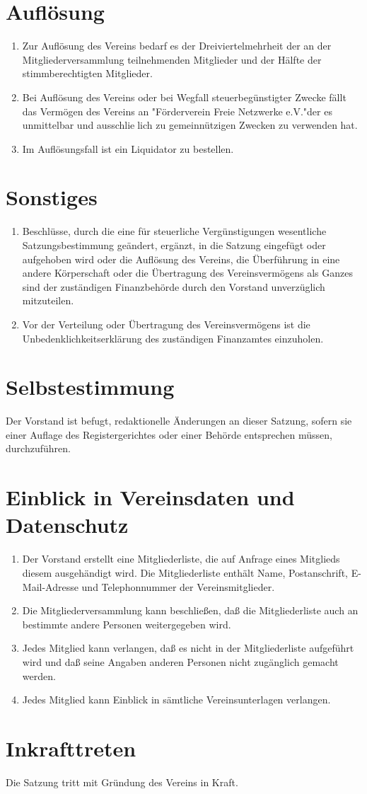 \documentclass[ngerman]{article}
\begin{document}
\section{Auflösung}
\begin{enumerate}
\item Zur Auflösung des Vereins bedarf es der Dreiviertelmehrheit der an der Mitgliederversammlung teilnehmenden Mitglieder und der Hälfte
der stimmberechtigten Mitglieder.
\item Bei Auflösung des Vereins oder bei Wegfall steuerbegünstigter Zwecke fällt das Vermögen
des  Vereins an  "Förderverein Freie Netzwerke e.V."der es unmittelbar und  ausschlielich zu gemeinnützigen Zwecken zu verwenden hat.
\item Im Auflösungsfall ist ein Liquidator zu bestellen.
\end{enumerate}

\section{Sonstiges}
\begin{enumerate}
\item Beschlüsse, durch die eine für steuerliche Vergünstigungen wesentliche Satzungsbestimmung geändert, ergänzt, in die Satzung eingefügt oder aufgehoben wird oder die Auflösung des Vereins, die Überführung in eine andere Körperschaft oder die Übertragung des Vereinsvermögens als Ganzes sind der zuständigen Finanzbehörde durch den Vorstand unverzüglich mitzuteilen.
\item Vor der Verteilung oder Übertragung des Vereinsvermögens ist die Unbedenklichkeitserklärung des zuständigen Finanzamtes einzuholen.
\end{enumerate}

\section{Selbstestimmung}
Der Vorstand ist befugt, redaktionelle Änderungen an dieser Satzung, sofern sie einer Auflage des Registergerichtes oder einer Behörde entsprechen müssen, durchzuführen.

\section{Einblick in Vereinsdaten und Datenschutz}
\begin{enumerate}
  \item Der Vorstand erstellt eine Mitgliederliste, die auf Anfrage eines Mitglieds diesem ausgehändigt wird.
  Die Mitgliederliste enthält Name, Postanschrift, E-Mail-Adresse und Telephonnummer der Vereinsmitglieder.
  \item Die Mitgliederversammlung kann beschließen, daß die Mitgliederliste auch an bestimmte andere Personen weitergegeben wird.
  \item Jedes Mitglied kann verlangen, daß es nicht in der Mitgliederliste aufgeführt wird und daß seine Angaben anderen Personen nicht zugänglich gemacht werden.
  \item Jedes Mitglied kann Einblick in sämtliche Vereinsunterlagen verlangen.
\end{enumerate}

\section{Inkrafttreten}

Die Satzung tritt mit Gründung des Vereins in Kraft.
\end{document}
